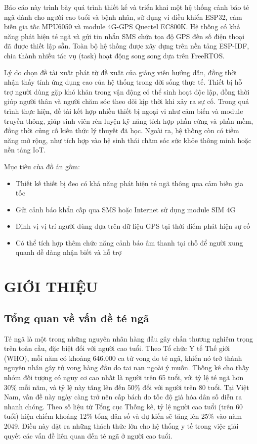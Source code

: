 \documentclass[a4paper,12pt]{report}
\begin{document}
	Báo cáo này trình bày quá trình thiết kế và triển khai một hệ thống cảnh báo té ngã dành cho người cao tuổi và bệnh nhân, sử dụng vi điều khiển ESP32, cảm biến gia tốc MPU6050 và module 4G-GPS Quectel EC800K. Hệ thống có khả năng phát hiện té ngã và gửi tin nhắn SMS chứa tọa độ GPS đến số điện thoại đã được thiết lập sẵn. Toàn bộ hệ thống được xây dựng trên nền tảng ESP-IDF, chia thành nhiều tác vụ (task) hoạt động song song dựa trên FreeRTOS.
	
	Lý do chọn đề tài xuất phát từ đề xuất của giảng viên hướng dẫn, đồng thời nhận thấy tính ứng dụng cao của hệ thống trong đời sống thực tế. Thiết bị hỗ trợ người dùng gặp khó khăn trong vận động có thể sinh hoạt độc lập, đồng thời giúp người thân và người chăm sóc theo dõi kịp thời khi xảy ra sự cố. Trong quá trình thực hiện, đề tài kết hợp nhiều thiết bị ngoại vi như cảm biến và module truyền thông, giúp sinh viên rèn luyện kỹ năng tích hợp phần cứng và phần mềm, đồng thời củng cố kiến thức lý thuyết đã học. Ngoài ra, hệ thống còn có tiềm năng mở rộng, như tích hợp vào hệ sinh thái chăm sóc sức khỏe thông minh hoặc nền tảng IoT.
	
	Mục tiêu của đồ án gồm:
	\begin{itemize}
		\item Thiết kế thiết bị đeo có khả năng phát hiện té ngã thông qua cảm biến gia tốc
		\item Gửi cảnh báo khẩn cấp qua SMS hoặc Internet sử dụng module SIM 4G
		\item Định vị vị trí người dùng dựa trên dữ liệu GPS tại thời điểm phát hiện sự cố
		\item Có thể tích hợp thêm chức năng cảnh báo âm thanh tại chỗ để người xung quanh dễ dàng nhận biết và hỗ trợ
	\end{itemize}
	\newpage
	
	\chapter{GIỚI THIỆU}
	
	
	\section{Tổng quan về vấn đề té ngã}
	
	Té ngã là một trong những nguyên nhân hàng đầu gây chấn thương nghiêm trọng trên toàn cầu, đặc biệt đối với người cao tuổi. Theo Tổ chức Y tế Thế giới (WHO), mỗi năm có khoảng 646.000 ca tử vong do té ngã, khiến nó trở thành nguyên nhân gây tử vong hàng đầu do tai nạn ngoài ý muốn. Thống kê cho thấy nhóm đối tượng có nguy cơ cao nhất là người trên 65 tuổi, với tỷ lệ té ngã hơn 30\% mỗi năm, và tỷ lệ này tăng lên đến 50\% đối với người trên 80 tuổi. Tại Việt Nam, vấn đề này ngày càng trở nên cấp bách do tốc độ già hóa dân số diễn ra nhanh chóng. Theo số liệu từ Tổng cục Thống kê, tỷ lệ người cao tuổi (trên 60 tuổi) hiện chiếm khoảng 12\% tổng dân số và dự kiến sẽ tăng lên 25\% vào năm 2049. Điều này đặt ra những thách thức lớn cho hệ thống y tế trong việc giải quyết các vấn đề liên quan đến té ngã ở người cao tuổi.
	
\end{document}
